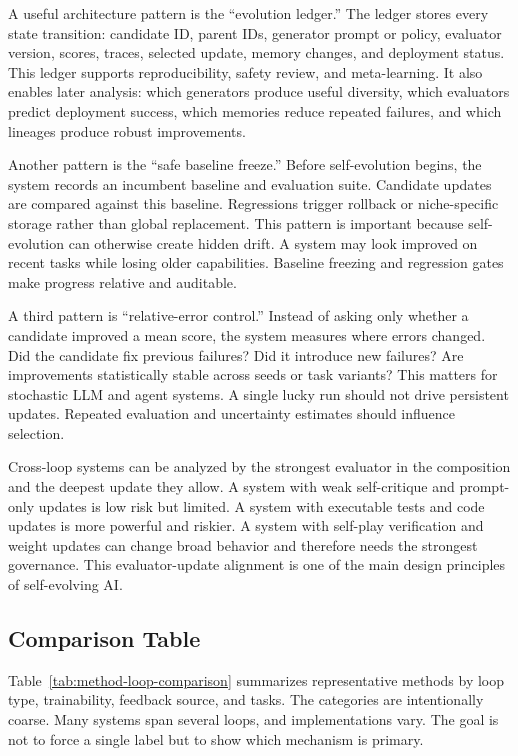 A useful architecture pattern is the ``evolution ledger.''  The ledger stores every state transition: candidate ID, parent IDs, generator prompt or policy, evaluator version, scores, traces, selected update, memory changes, and deployment status.  This ledger supports reproducibility, safety review, and meta-learning.  It also enables later analysis: which generators produce useful diversity, which evaluators predict deployment success, which memories reduce repeated failures, and which lineages produce robust improvements.

Another pattern is the ``safe baseline freeze.''  Before self-evolution begins, the system records an incumbent baseline and evaluation suite.  Candidate updates are compared against this baseline.  Regressions trigger rollback or niche-specific storage rather than global replacement.  This pattern is important because self-evolution can otherwise create hidden drift.  A system may look improved on recent tasks while losing older capabilities.  Baseline freezing and regression gates make progress relative and auditable.

A third pattern is ``relative-error control.''  Instead of asking only whether a candidate improved a mean score, the system measures where errors changed.  Did the candidate fix previous failures?  Did it introduce new failures?  Are improvements statistically stable across seeds or task variants?  This matters for stochastic LLM and agent systems.  A single lucky run should not drive persistent updates.  Repeated evaluation and uncertainty estimates should influence selection.

Cross-loop systems can be analyzed by the strongest evaluator in the composition and the deepest update they allow.  A system with weak self-critique and prompt-only updates is low risk but limited.  A system with executable tests and code updates is more powerful and riskier.  A system with self-play verification and weight updates can change broad behavior and therefore needs the strongest governance.  This evaluator-update alignment is one of the main design principles of self-evolving AI.

\subsection{Comparison Table}
\label{subsec:taxonomy-comparison-table}

Table~\ref{tab:method-loop-comparison} summarizes representative methods by loop type, trainability, feedback source, and tasks.  The categories are intentionally coarse.  Many systems span several loops, and implementations vary.  The goal is not to force a single label but to show which mechanism is primary.

